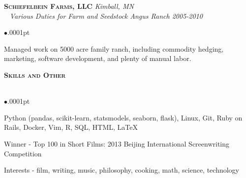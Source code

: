 \documentclass[11pt]{article}
\newcommand{\lineunder}{\vspace*{-8pt} \\ \hspace*{-18pt} \hrulefill \\}
\newcommand{\header}[1]{{\hspace*{-15pt}\vspace*{5pt} \Large \textsc{\textbf{#1}}} \vspace*{-6pt} \lineunder \vspace*{0pt} }
\newcommand{\employer}[4]{{\hspace*{-20pt} {\small{\textbf{\textsc{ #1}}}}
  \hfill \small{\emph{#2}}\\ ~\hspace*{-20pt} \small \emph{ #3 \hfill #4}}\\ }
\newenvironment{achievements}{\begin{list}{$\bullet$}{\topsep .0001pt \itemsep -2pt}}{\vspace*{5pt}\end{list} }
\begin{document}


\employer{Schiefelbein Farms, LLC } {Kimball, MN} {Various Duties for Farm and Seedstock Angus Ranch} {2005-2010}\nopagebreak[4]
	\begin{achievements}
	\item 	Managed work on 5000 acre family ranch, including commodity hedging, marketing, software development, and plenty of manual labor.
	\end{achievements}

\header{Skills and Other}
	\vspace{-2pt}
	\begin{achievements}
	\item  Python (pandas, scikit-learn, statsmodels, seaborn, flask), Linux, Git, Ruby on Rails, Docker, Vim, R, SQL, HTML, \LaTeX{}
	\item  Winner - Top 100 in Short Films: 2013 Beijing International Screenwriting Competition
	\item Interests - film, writing, music, philosophy, cooking, math, science, technology 

	




\end{achievements}
\end{document}

